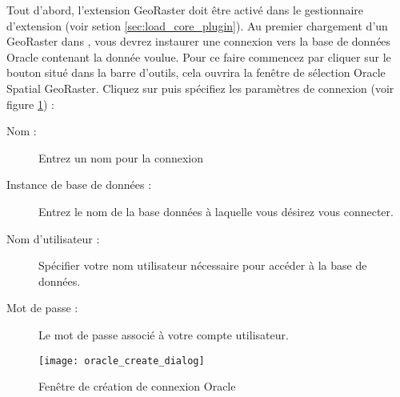 Tout d'abord, l'extension GeoRaster doit être activé dans le gestionnaire d'extension (voir setion \ref{sec:load_core_plugin}). Au premier chargement d'un GeoRaster dans \qg, vous devrez instaurer une connexion vers la base de données Oracle contenant la donnée voulue. Pour ce faire commencez par cliquer sur le bouton  situé dans la barre d'outils, cela ouvrira la fenêtre de sélection Oracle Spatial GeoRaster. Cliquez sur  puis spécifiez les paramètres de connexion (voir figure \ref{fig:oracle_create}) :


\begin{description}
\item[Nom :] Entrez un nom pour la connexion
\item[Instance de base de données :] Entrez le nom de la base données à laquelle vous désirez vous connecter.
\item[Nom d'utilisateur :] Spécifier votre nom utilisateur nécessaire pour accéder à la base de données.
\item[Mot de passe :] Le mot de passe associé à votre compte utilisateur.
\end{description}


\begin{figure}[ht]
\centering
   \texttt{[image: oracle\_create\_dialog]}
   \caption{Fenêtre de création de connexion Oracle \nixcaption}\label{fig:oracle_create}
\end{figure}

